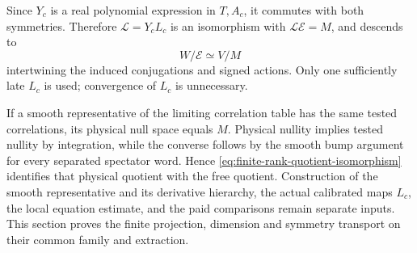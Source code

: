 Since $Y_c$ is a real polynomial expression in $T,A_c$, it commutes
with both symmetries. Therefore $\mathcal L=Y_cL_c$ is an isomorphism
with $\mathcal L\mathcal E=M$, and descends to
\begin{equation}\label{eq:finite-rank-quotient-isomorphism}
                         W/\mathcal E\simeq V/M
\end{equation}
intertwining the induced conjugations and signed actions. Only one
sufficiently late $L_c$ is used; convergence of $L_c$ is unnecessary.

If a smooth representative of the limiting correlation table has the
same tested correlations, its physical null space equals $M$.
Physical nullity implies tested nullity by integration, while the
converse follows by the smooth bump argument for every separated
spectator word. Hence \eqref{eq:finite-rank-quotient-isomorphism}
identifies that physical quotient with the free quotient. Construction
of the smooth representative and its derivative hierarchy, the actual
calibrated maps $L_c$, the local equation estimate, and the paid
comparisons remain separate inputs. This section proves the finite
projection, dimension and symmetry transport on their common family
and extraction.
